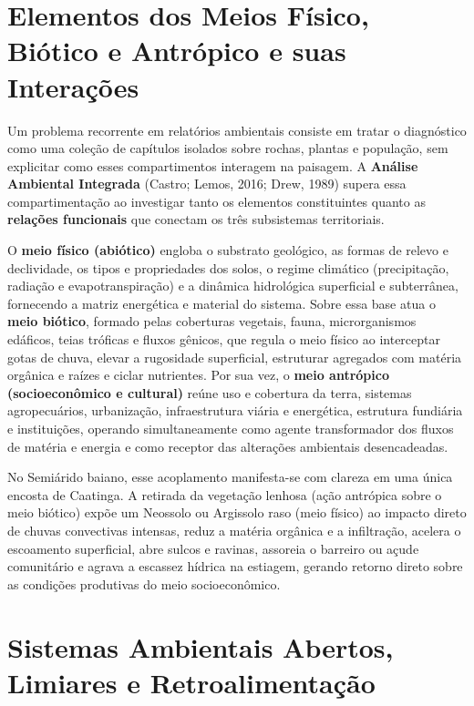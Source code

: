 \section{Elementos dos Meios Físico, Biótico e Antrópico e suas Interações}

Um problema recorrente em relatórios ambientais consiste em tratar o diagnóstico como uma coleção de capítulos isolados sobre rochas, plantas e população, sem explicitar como esses compartimentos interagem na paisagem. A \textbf{Análise Ambiental Integrada} (Castro; Lemos, 2016; Drew, 1989) supera essa compartimentação ao investigar tanto os elementos constituintes quanto as \textbf{relações funcionais} que conectam os três subsistemas territoriais.

O \textbf{meio físico (abiótico)} engloba o substrato geológico, as formas de relevo e declividade, os tipos e propriedades dos solos, o regime climático (precipitação, radiação e evapotranspiração) e a dinâmica hidrológica superficial e subterrânea, fornecendo a matriz energética e material do sistema. Sobre essa base atua o \textbf{meio biótico}, formado pelas coberturas vegetais, fauna, microrganismos edáficos, teias tróficas e fluxos gênicos, que regula o meio físico ao interceptar gotas de chuva, elevar a rugosidade superficial, estruturar agregados com matéria orgânica e raízes e ciclar nutrientes. Por sua vez, o \textbf{meio antrópico (socioeconômico e cultural)} reúne uso e cobertura da terra, sistemas agropecuários, urbanização, infraestrutura viária e energética, estrutura fundiária e instituições, operando simultaneamente como agente transformador dos fluxos de matéria e energia e como receptor das alterações ambientais desencadeadas.

No Semiárido baiano, esse acoplamento manifesta-se com clareza em uma única encosta de Caatinga. A retirada da vegetação lenhosa (ação antrópica sobre o meio biótico) expõe um Neossolo ou Argissolo raso (meio físico) ao impacto direto de chuvas convectivas intensas, reduz a matéria orgânica e a infiltração, acelera o escoamento superficial, abre sulcos e ravinas, assoreia o barreiro ou açude comunitário e agrava a escassez hídrica na estiagem, gerando retorno direto sobre as condições produtivas do meio socioeconômico.

\section{Sistemas Ambientais Abertos, Limiares e Retroalimentação}


